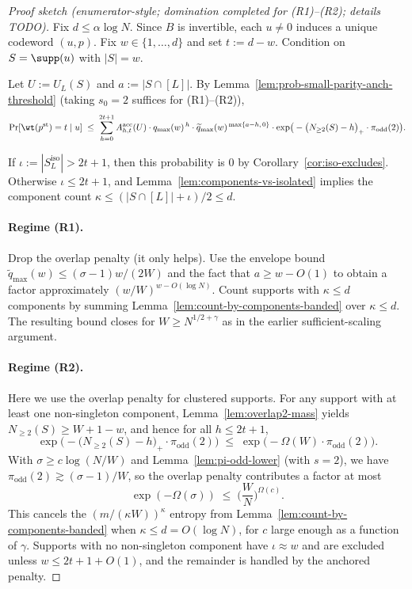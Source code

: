 \begin{proof}[Proof sketch (enumerator-style; domination completed for (R1)--(R2); details TODO)]
Fix $d\le \alpha\log N$. Since $B$ is invertible, each $u\neq 0$ induces a unique codeword $(u,p)$.
Fix $w\in\{1,\dots,d\}$ and set $t:=d-w$.
Condition on $S=\supp(u)$ with $|S|=w$.

Let $U:=U_L(S)$ and $a:=|S\cap[L]|$.
By Lemma~\ref{lem:prob-small-parity-anch-threshold} (taking $s_0=2$ suffices for (R1)--(R2)),
\[
\Pr[\wt(p^{\mathrm{st}})=t\mid u]
\;\le\;
\sum_{h=0}^{2t+1}
A^{\mathrm{acc}}_{h,t}(U)\cdot
q_{\max}(w)^{\,h}\cdot
\widetilde q_{\max}(w)^{\,\max\{a-h,\,0\}}\cdot
\exp\!\big(-\big(N_{\ge 2}(S)-h\big)_+\cdot \pi_{\mathrm{odd}}(2)\big).
\]

If $\iota:=|S_L^{\mathrm{iso}}|>2t+1$, then this probability is $0$ by Corollary~\ref{cor:iso-excludes}.
Otherwise $\iota\le 2t+1$, and Lemma~\ref{lem:components-vs-isolated} implies the component count
$\kappa\le (|S\cap[L]|+\iota)/2\le d$.

\paragraph{Regime (R1).}
Drop the overlap penalty (it only helps).
Use the envelope bound $\widetilde q_{\max}(w)\le (\sigma-1)w/(2W)$ and the fact that $a\ge w-O(1)$ to obtain a factor
approximately $(w/W)^{w-O(\log N)}$.
Count supports with $\kappa\le d$ components by summing Lemma~\ref{lem:count-by-components-banded} over $\kappa\le d$.
The resulting bound closes for $W\ge N^{1/2+\gamma}$ as in the earlier sufficient-scaling argument.

\paragraph{Regime (R2).}
Here we use the overlap penalty for clustered supports. For any support with at least one non-singleton component,
Lemma~\ref{lem:overlap2-mass} yields $N_{\ge 2}(S)\ge W+1-w$, and hence for all $h\le 2t+1$,
\[
\exp\!\big(-\big(N_{\ge 2}(S)-h\big)_+\cdot \pi_{\mathrm{odd}}(2)\big)
\;\le\;
\exp\!\big(-\Omega(W)\cdot \pi_{\mathrm{odd}}(2)\big).
\]
With $\sigma\ge c\log(N/W)$ and Lemma~\ref{lem:pi-odd-lower} (with $s=2$), we have
$\pi_{\mathrm{odd}}(2)\gtrsim (\sigma-1)/W$, so the overlap penalty contributes a factor at most
\[
\exp(-\Omega(\sigma)) \;\le\; \Big(\frac{W}{N}\Big)^{\Omega(c)}.
\]
This cancels the $(m/(\kappa W))^\kappa$ entropy from Lemma~\ref{lem:count-by-components-banded} when $\kappa\le d=O(\log N)$,
for $c$ large enough as a function of $\gamma$.
Supports with no non-singleton component have $\iota\approx w$ and are excluded unless $w\le 2t+1+O(1)$, and the remainder
is handled by the anchored penalty.


\end{proof}
